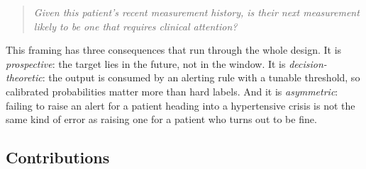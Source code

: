 \documentclass[11pt,a4paper]{article}
\begin{document}
\begin{quote}
\itshape Given this patient's recent measurement history, is their next
measurement likely to be one that requires clinical attention?
\end{quote}

This framing has three consequences that run through the whole design. It is
\emph{prospective}: the target lies in the future, not in the window. It is
\emph{decision-theoretic}: the output is consumed by an alerting rule with a
tunable threshold, so calibrated probabilities matter more than hard labels. And
it is \emph{asymmetric}: failing to raise an alert for a patient heading into a
hypertensive crisis is not the same kind of error as raising one for a patient who
turns out to be fine.

\subsection{Contributions}
\end{document}

